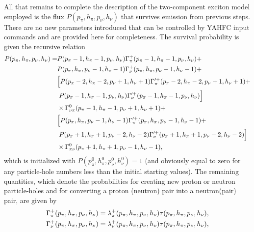 \documentclass[
10pt,
showpacs,preprintnumbers,footinbib,
amsfonts,amsmath,amssymb,
aps,
prc,twocolumn,groupedaddress,superscriptaddress,
showkeys,
nofootinbib
]{revtex4-1}
\begin{document}
\begin{widetext}
All that remains to complete the description of the two-component exciton model employed is the flux $P(p_\pi, h_\pi, p_\nu, h_\nu)$ that survives emission from previous steps. There are no new parameters introduced that can be controlled by YAHFC input commands and are provided here for completeness. The survival probability is given the recursive relation~\cite{Koning:2004}
\begin{align}
P(p_\pi, h_\pi, p_\nu, h_\nu) = & P(p_\pi-1, h_\pi-1, p_\nu, h_\nu) \Gamma_\pi^+(p_\pi-1, h_\pi-1, p_\nu, h_\nu) + \notag\\
                                                 & P(p_\pi, h_\pi, p_\nu-1, h_\nu-1) \Gamma_\nu^+(p_\pi, h_\pi, p_\nu-1, h_\nu-1) + \notag \\
                                                 & \Big [P(p_\pi-2, h_\pi-2, p_\nu+1, h_\nu+1) \Gamma_\pi^{\prime +}(p_\pi-2, h_\pi-2, p_\nu+1, h_\nu+1) + \notag \\
                                                 & \hskip 0.1 cm P(p_\pi-1, h_\pi-1, p_\nu, h_\nu) \Gamma_\nu^{\prime +}(p_\pi-1, h_\pi-1, p_\nu, h_\nu) \Big ] \notag \\
                                                  & \times \Gamma^0_{\nu\pi}(p_\pi-1, h_\pi-1, p_\nu+1, h_\nu+1) + \notag\\
                                                 & \Big [ P(p_\pi, h_\pi, p_\nu-1, h_\nu-1) \Gamma_\pi^{\prime +}(p_\pi, h_\pi, p_\nu-1, h_\nu-1) + \notag \\
                                                 & \hskip 0.1 cm P(p_\pi+1, h_\pi+1, p_\nu-2, h_\nu-2) \Gamma_\nu^{\prime +}(p_\pi+1, h_\pi+1, p_\nu-2, h_\nu-2) \Big ] \notag\\
                                                 & \times \Gamma^0_{\pi\nu}(p_\pi+1, h_\pi+1, p_\nu-1, h_\nu-1),
\end{align}
which is initialized with $P(p_\pi^0, h_\pi^0, p_\nu^0, h_\nu^0) = 1$ (and obviously equal to zero for any particle-hole numbers less than the initial starting values). The remaining quantities, which denote the probabilities for creating new proton or neutron particle-holes and for converting a proton (neutron) pair into a neutron(pair) pair, are given by
\begin{align}
\Gamma_\pi^+(p_\pi, h_\pi, p_\nu, h_\nu)  & = \lambda_\pi^+(p_\pi, h_\pi, p_\nu, h_\nu) \tau(p_\pi, h_\pi, p_\nu, h_\nu), \notag \\
\Gamma_\nu^+(p_\pi, h_\pi, p_\nu, h_\nu) & = \lambda_\nu^+(p_\pi, h_\pi, p_\nu, h_\nu) \tau(p_\pi, h_\pi, p_\nu, h_\nu), \notag \\

\end{align}
\end{widetext}
\end{document}
